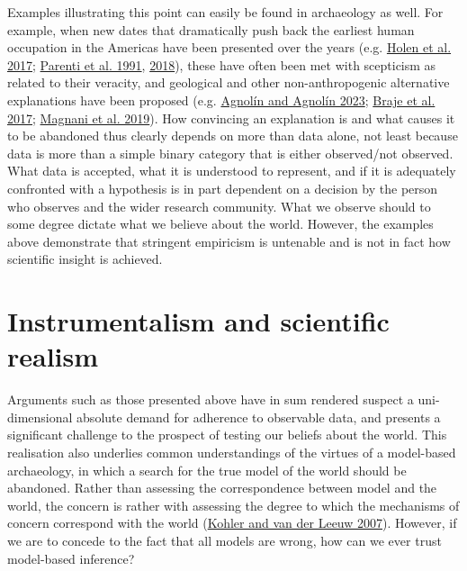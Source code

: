 \documentclass[
  12pt,
  a4paper,
  oneside]{book}
\begin{document}
Examples illustrating this point can easily be found in archaeology as well. For example, when new dates that dramatically push back the earliest human occupation in the Americas have been presented over the years (e.g. \protect\hyperlink{ref-holen2017}{Holen et al. 2017}; \protect\hyperlink{ref-parenti1991}{Parenti et al. 1991}, \protect\hyperlink{ref-parenti2018}{2018}), these have often been met with scepticism as related to their veracity, and geological and other non-anthropogenic alternative explanations have been proposed (e.g. \protect\hyperlink{ref-agnolin2023}{Agnolín and Agnolín 2023}; \protect\hyperlink{ref-braje2017}{Braje et al. 2017}; \protect\hyperlink{ref-magnani2019}{Magnani et al. 2019}). How convincing an explanation is and what causes it to be abandoned thus clearly depends on more than data alone, not least because data is more than a simple binary category that is either observed/not observed. What data is accepted, what it is understood to represent, and if it is adequately confronted with a hypothesis is in part dependent on a decision by the person who observes and the wider research community. What we observe should to some degree dictate what we believe about the world. However, the examples above demonstrate that stringent empiricism is untenable and is not in fact how scientific insight is achieved.

\hypertarget{instrumentalism-and-scientific-realism}{%
\section{Instrumentalism and scientific realism}\label{instrumentalism-and-scientific-realism}}

Arguments such as those presented above have in sum rendered suspect a uni-dimensional absolute demand for adherence to observable data, and presents a significant challenge to the prospect of testing our beliefs about the world. This realisation also underlies common understandings of the virtues of a model-based archaeology, in which a search for the true model of the world should be abandoned. Rather than assessing the correspondence between model and the world, the concern is rather with assessing the degree to which the mechanisms of concern correspond with the world (\protect\hyperlink{ref-kohler2007}{Kohler and van der Leeuw 2007}). However, if we are to concede to the fact that all models are wrong, how can we ever trust model-based inference?
\end{document}
